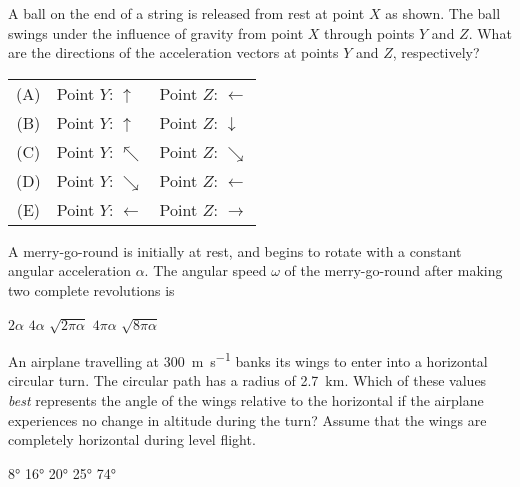 \documentclass{../../oss-classkick-exam}
\begin{document}
\begin{multicols*}{2}
\begin{questions}
    \question A ball on the end of a string is released from rest at point $X$
    as shown. The ball swings under the influence of gravity from point $X$
    through points $Y$ and $Z$. What are the directions of the acceleration
    vectors at points $Y$ and $Z$, respectively?
    \begin{tabular}{cll}
      (A) & Point $Y$: {\LARGE $\uparrow$} & Point $Z$: {\LARGE $\leftarrow$}\\
      (B) & Point $Y$: {\LARGE $\uparrow$} & Point $Z$: {\LARGE $\downarrow$}\\
      (C) & Point $Y$: {\LARGE $\nwarrow$} & Point $Z$: {\LARGE $\searrow$}\\
      (D) & Point $Y$: {\LARGE $\searrow$} & Point $Z$: {\LARGE $\leftarrow$}\\
      (E) & Point $Y$: {\LARGE $\leftarrow$}&Point $Z$: {\LARGE $\rightarrow$}\\
    \end{tabular}
    \vspace{.7in}

    \question A merry-go-round is initially at rest, and begins to rotate with a
    constant angular acceleration $\alpha$. The angular speed $\omega$ of the
    merry-go-round after making two complete revolutions is
    \begin{choices}
      \choice $2\alpha$
      \choice $4\alpha$
      \choice $\sqrt{2\pi\alpha}$
      \choice $4\pi\alpha$
      \choice $\sqrt{8\pi\alpha}$
    \end{choices}

    \question An airplane travelling at \SI{300}{\metre\per\second} banks its
    wings to enter into a horizontal circular turn. The circular path has a
    radius of \SI{2.7}{\kilo\metre}. Which of these values \emph{best}
    represents the angle of the wings relative to the horizontal if the airplane
    experiences no change in altitude during the turn? Assume that the wings
    are completely horizontal during level flight.
    \begin{choices}
      \choice\ang{8}
      \choice\ang{16}
      \choice\ang{20}
      \choice\ang{25}
      \correctchoice\ang{74}
    \end{choices}
    \columnbreak
    
\end{questions}
\end{multicols*}
\end{document}
